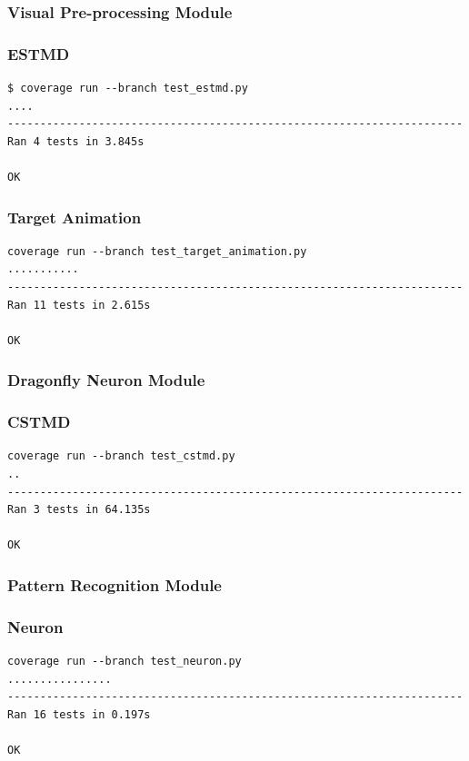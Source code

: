 \documentclass[a4paper,11pt]{article}
\begin{document}
\begin{appendices}
\subsubsection{Visual Pre-processing Module}
\subsubsection*{ESTMD}
\begin{verbatim}
$ coverage run --branch test_estmd.py
....
----------------------------------------------------------------------
Ran 4 tests in 3.845s

OK
\end{verbatim}
\subsubsection*{Target Animation}
\begin{verbatim}
coverage run --branch test_target_animation.py
...........
----------------------------------------------------------------------
Ran 11 tests in 2.615s

OK
\end{verbatim}

\subsubsection{Dragonfly Neuron Module}
\subsubsection*{CSTMD}
\begin{verbatim}
coverage run --branch test_cstmd.py
..
----------------------------------------------------------------------
Ran 3 tests in 64.135s

OK
\end{verbatim}

\subsubsection{Pattern Recognition Module}
\subsubsection*{Neuron}
\begin{verbatim}
coverage run --branch test_neuron.py
................
----------------------------------------------------------------------
Ran 16 tests in 0.197s

OK
\end{verbatim}


\end{appendices}
\end{document}
